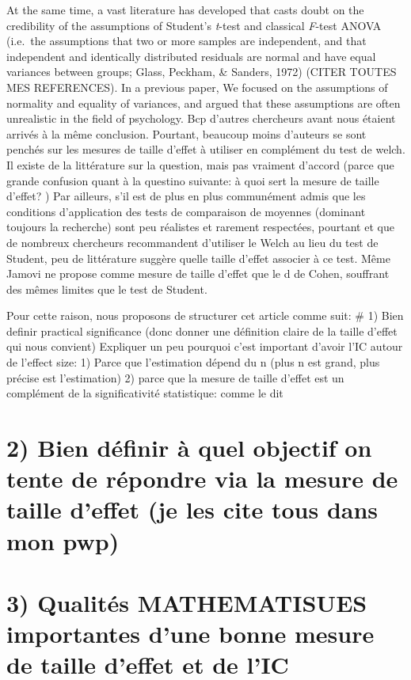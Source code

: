 \documentclass[man]{apa6}
\begin{document}
At the same time, a vast literature has developed that casts doubt on the credibility of the assumptions of Student's \emph{t}-test and classical \emph{F}-test ANOVA (i.e.~the assumptions that two or more samples are independent, and that independent and identically distributed residuals are normal and have equal variances between groups; Glass, Peckham, \& Sanders, 1972) (CITER TOUTES MES REFERENCES). In a previous paper, We focused on the assumptions of normality and equality of variances, and argued that these assumptions are often unrealistic in the field of psychology. Bcp d'autres chercheurs avant nous étaient arrivés à la même conclusion. Pourtant, beaucoup moins d'auteurs se sont penchés sur les mesures de taille d'effet à utiliser en complément du test de welch. Il existe de la littérature sur la question, mais pas vraiment d'accord (parce que grande confusion quant à la questino suivante: à quoi sert la mesure de taille d'effet? ) Par ailleurs, s'il est de plus en plus communément admis que les conditions d'application des tests de comparaison de moyennes (dominant toujours la recherche) sont peu réalistes et rarement respectées, pourtant et que de nombreux chercheurs recommandent d'utiliser le Welch au lieu du test de Student, peu de littérature suggère quelle taille d'effet associer à ce test. Même Jamovi ne propose comme mesure de taille d'effet que le d de Cohen, souffrant des mêmes limites que le test de Student.

Pour cette raison, nous proposons de structurer cet article comme suit:
\# 1) Bien definir practical significance (donc donner une définition claire de la taille d'effet qui nous convient)
Expliquer un peu pourquoi c'est important d'avoir l'IC autour de l'effect size:
1) Parce que l'estimation dépend du n (plus n est grand, plus précise est l'estimation)
2) parce que la mesure de taille d'effet est un complément de la significativité statistique: comme le dit

\hypertarget{bien-duxe9finir-uxe0-quel-objectif-on-tente-de-ruxe9pondre-via-la-mesure-de-taille-deffet-je-les-cite-tous-dans-mon-pwp}{%
\section{2) Bien définir à quel objectif on tente de répondre via la mesure de taille d'effet (je les cite tous dans mon pwp)}\label{bien-duxe9finir-uxe0-quel-objectif-on-tente-de-ruxe9pondre-via-la-mesure-de-taille-deffet-je-les-cite-tous-dans-mon-pwp}}

\hypertarget{qualituxe9s-mathematisues-importantes-dune-bonne-mesure-de-taille-deffet-et-de-lic}{%
\section{3) Qualités MATHEMATISUES importantes d'une bonne mesure de taille d'effet et de l'IC}\label{qualituxe9s-mathematisues-importantes-dune-bonne-mesure-de-taille-deffet-et-de-lic}}
\end{document}
